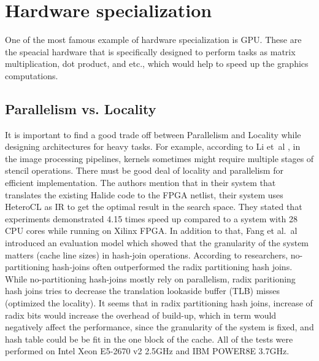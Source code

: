 \documentclass[conference]{IEEEtran}
\begin{document}
\section{Hardware specialization}
One of the most famous example of hardware specialization is GPU. These are the speacial hardware that is specifically designed to perform tasks as matrix multiplication, dot product, and etc., which would help to speed up the graphics computations. 

\subsection{Parallelism vs. Locality}
It is important to find a good trade off between Parallelism and Locality while designing architectures for heavy tasks. For example, according to Li et~al \cite{ref9}, in the image processing pipelines, kernels sometimes might require multiple stages of stencil operations. There must be good deal of locality and parallelism for efficient implementation. The authors mention that in their system that translates the existing Halide code to the FPGA netlist, their system uses HeteroCL as IR to get the optimal result in the search space. They stated that experiments demonstrated 4.15 times speed up compared to a system with 28 CPU cores while running on Xilinx FPGA. In addition to that, Fang et al.~al \cite{ref15} introduced an evaluation model which showed that the granularity of the system matters (cache line sizes) in hash-join operations. According to researchers, no-partitioning hash-joins often outperformed the radix partitioning hash joins. While no-partitioning hash-joins mostly rely on parallelism, radix paritioning hash joins tries to decrease the translation lookaside buffer (TLB) misses (optimized the locality). It seems that in radix partitioning hash joins, increase of radix bits would increase the overhead of build-up, which in term would negatively affect the performance, since the granularity of the system is fixed, and hash table could be be fit in the one block of the cache. All of the tests were performed on Intel Xeon E5-2670 v2 2.5GHz and IBM POWER8E 3.7GHz.  
\end{document}

